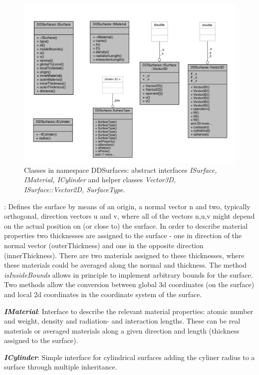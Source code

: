 \documentclass[10pt,a4paper]{article}
\begin{document}
\begin{figure}[h]
  \begin{center}
    \includegraphics[width=120mm] {DDRec_ISurface_classes}
    \caption{Classes in namespace DDSurfaces: abstract interfaces {\em ISurface, IMaterial, ICylinder}
      and helper classes {\em Vector3D, ISurface::Vector2D, SurfaceType}. }
    \label{fig:ddrec_ddsurfaces_classes}
  \end{center}
\end{figure}

: Defines the surface by means of an origin, a normal vector n and two, 
typically orthogonal, direction vectors u and v, where all of the vectors n,u,v might depend 
on the actual position on (or close to) the surface. In order to describe material properties
two thicknesses are assigned to the surface - one in direction of the normal vector (outerThickness) 
and one in the opposite direction (innerThickness). There are two materials assigned to these
thicknesses, where these materials could be averaged along the normal and thickness.
The method {\em isInsideBounds} allows in principle to implement arbitrary bounds for the surface.
Two methods allow the conversion between global 3d coordinates (on the surface) and local 2d coordinates 
in the coordinate system of the surface.
 
\noindent
{\em \bf IMaterial}: Interface to describe the relevant material properties: atomic number and weight, 
density and radiation- and interaction lengths. These can be real materials or averaged materials along
a given direction and length (thickness assigned to the surface).

\noindent
{\em \bf ICylinder}: Simple interface for cylindrical surfaces adding the cyliner radius to a surface
through multiple inheritance.
\end{document}
